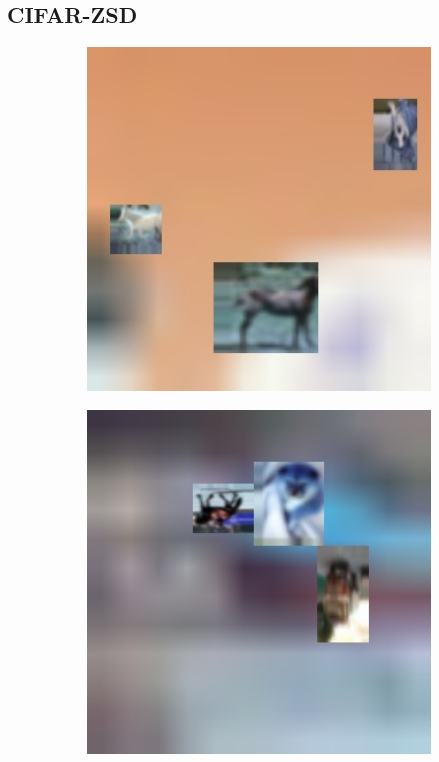 \subsection{CIFAR-ZSD} \label{ssec:cifarzsd}
\begin{figure}[H]
	\begin{center}
		\begin{subfigure}{.3\textwidth}
			\includegraphics[width=1\textwidth]{img/cifar-zsd-test400.jpg}
			\label{fig:ex1}
		\end{subfigure}
		\begin{subfigure}{.3\textwidth}
			\includegraphics[width=1\textwidth]{img/cifar-zsd-test379.jpg}

\end{subfigure}
\end{center}
\end{figure}
